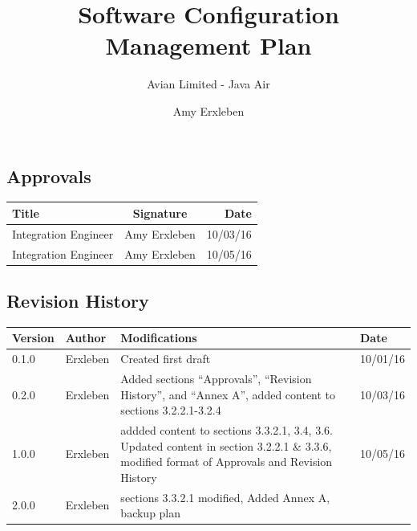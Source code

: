 \documentclass{scrartcl}
\begin{document}
\title{Software Configuration Management Plan}
\subtitle{Avian Limited - Java Air}
\author{Amy Erxleben}

\maketitle
\newpage
\subsection*{Approvals}

\begin{center}
\begin{tabular}{|  l | c | r | }
\hline
  \textbf{Title} & \textbf{Signature} & \textbf{Date} \\ \hline
  Integration Engineer &  \oeschfamily Amy Erxleben & 10/03/16 \\ \hline
  Integration Engineer & \oeschfamily Amy Erxleben & 10/05/16 \\ \hline
\end{tabular}
\end{center}

\subsection*{Revision History}

\begin{center}
\begin{tabular}{| l | l | p{10cm} | l |}
\hline
\textbf{Version} & \textbf{Author} & \textbf{Modifications} & \textbf{Date} \\ \hline
0.1.0 & Erxleben & Created first draft  & 10/01/16 \\ \hline
0.2.0 & Erxleben & Added sections ``Approvals'', ``Revision History'', and ``Annex A'', added content to sections 3.2.2.1-3.2.4 & 10/03/16 \\ \hline
1.0.0 & Erxleben & addded content to sections 3.3.2.1, 3.4, 3.6.  Updated content in section 3.2.2.1 \& 3.3.6, modified format of Approvals and Revision History & 10/05/16 \\ \hline
2.0.0 & Erxleben & sections 3.3.2.1 modified, Added Annex A, backup plan \\ \hline
\end{tabular}
\end{center}
\newpage

\setcounter{secnumdepth}{4}
\setcounter{tocdepth}{4}
\tableofcontents

\newpage
\setcounter{section}{3}
\end{document}
